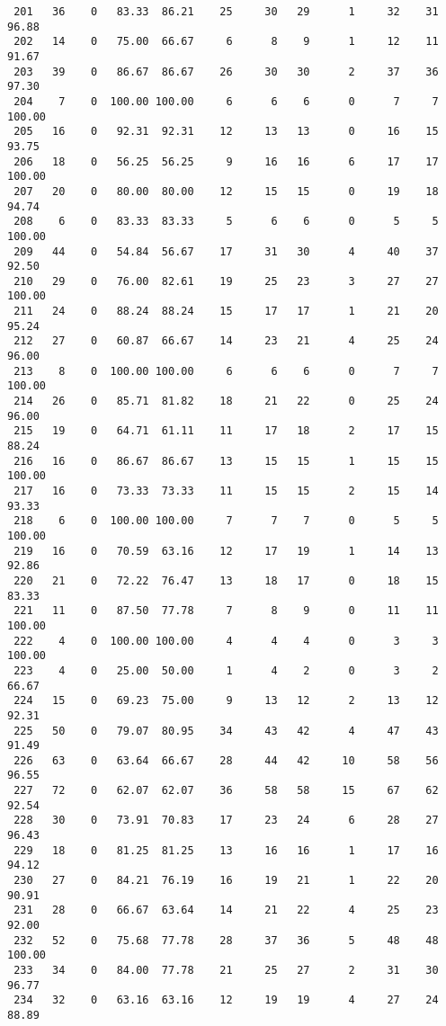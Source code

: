 \begin{verbatim}
 201   36    0   83.33  86.21    25     30   29      1     32    31    96.88
 202   14    0   75.00  66.67     6      8    9      1     12    11    91.67
 203   39    0   86.67  86.67    26     30   30      2     37    36    97.30
 204    7    0  100.00 100.00     6      6    6      0      7     7   100.00
 205   16    0   92.31  92.31    12     13   13      0     16    15    93.75
 206   18    0   56.25  56.25     9     16   16      6     17    17   100.00
 207   20    0   80.00  80.00    12     15   15      0     19    18    94.74
 208    6    0   83.33  83.33     5      6    6      0      5     5   100.00
 209   44    0   54.84  56.67    17     31   30      4     40    37    92.50
 210   29    0   76.00  82.61    19     25   23      3     27    27   100.00
 211   24    0   88.24  88.24    15     17   17      1     21    20    95.24
 212   27    0   60.87  66.67    14     23   21      4     25    24    96.00
 213    8    0  100.00 100.00     6      6    6      0      7     7   100.00
 214   26    0   85.71  81.82    18     21   22      0     25    24    96.00
 215   19    0   64.71  61.11    11     17   18      2     17    15    88.24
 216   16    0   86.67  86.67    13     15   15      1     15    15   100.00
 217   16    0   73.33  73.33    11     15   15      2     15    14    93.33
 218    6    0  100.00 100.00     7      7    7      0      5     5   100.00
 219   16    0   70.59  63.16    12     17   19      1     14    13    92.86
 220   21    0   72.22  76.47    13     18   17      0     18    15    83.33
 221   11    0   87.50  77.78     7      8    9      0     11    11   100.00
 222    4    0  100.00 100.00     4      4    4      0      3     3   100.00
 223    4    0   25.00  50.00     1      4    2      0      3     2    66.67
 224   15    0   69.23  75.00     9     13   12      2     13    12    92.31
 225   50    0   79.07  80.95    34     43   42      4     47    43    91.49
 226   63    0   63.64  66.67    28     44   42     10     58    56    96.55
 227   72    0   62.07  62.07    36     58   58     15     67    62    92.54
 228   30    0   73.91  70.83    17     23   24      6     28    27    96.43
 229   18    0   81.25  81.25    13     16   16      1     17    16    94.12
 230   27    0   84.21  76.19    16     19   21      1     22    20    90.91
 231   28    0   66.67  63.64    14     21   22      4     25    23    92.00
 232   52    0   75.68  77.78    28     37   36      5     48    48   100.00
 233   34    0   84.00  77.78    21     25   27      2     31    30    96.77
 234   32    0   63.16  63.16    12     19   19      4     27    24    88.89

\end{verbatim}
